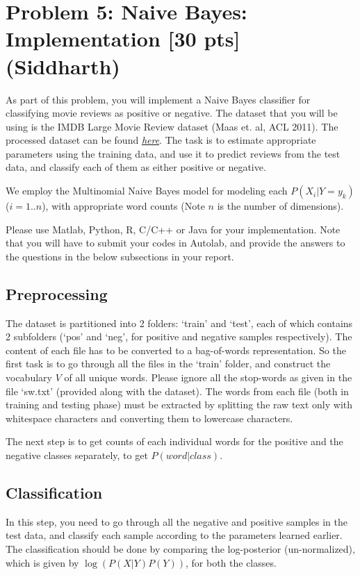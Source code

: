 \section*{Problem 5: Naive Bayes: Implementation [30 pts] (Siddharth)}

As part of this problem, you will implement a Naive Bayes classifier for classifying movie reviews as positive or negative. The dataset that you will be using is the IMDB Large Movie Review dataset (Maas et. al, ACL 2011). The processed dataset can be found \textit{\href{https://www.dropbox.com/s/liz0o40f5mpj8ye/hw1_dataset_nb.tar.gz?dl=0}{here}}. The task is to estimate appropriate parameters using the training data, and use it to predict reviews from the test data, and classify each of them as either positive or negative.

We employ the {\color{red}Multinomial Naive Bayes model for modeling each $P(X_i | Y = y_k)$ ($i = 1 .. n$), with appropriate word counts} (Note $n$ is the number of dimensions).

Please use Matlab, Python, R, C/C++ or Java for your implementation. Note that you will have to submit your codes in Autolab, and provide the answers to the questions in the below subsections in your report.

\subsection*{Preprocessing}
The dataset is partitioned into 2 folders: `train' and `test', each of which contains 2 subfolders (`pos' and `neg', for positive and negative samples respectively). The content of each file has to be converted to a bag-of-words representation. So the first task is to go through all the files in the `train' folder, and construct the vocabulary $V$ of all unique words. Please ignore all the stop-words as given in the file `sw.txt' (provided along with the dataset). The words from each file (both in training and testing phase) must be extracted by splitting the raw text only with whitespace characters and {\color{red}converting them to lowercase characters}. 

The next step is to get counts of each individual words for the positive and the negative classes separately, to get $P(word | class)$. 

\subsection*{Classification}
In this step, you need to go through all the negative and positive samples in the test data, and classify each sample according to the parameters learned earlier. The classification should be done by comparing the log-posterior (un-normalized), which is given by $\log(P(X|Y)P(Y))$, for both the classes.

